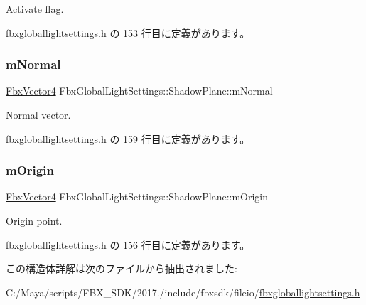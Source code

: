 Activate flag. 



 fbxgloballightsettings.\+h の 153 行目に定義があります。

\mbox{\label{struct_fbx_global_light_settings_1_1_shadow_plane_af68d57885d38ed6679a04bea2e663a33}} 
\subsubsection{\texorpdfstring{m\+Normal}{mNormal}}
{\footnotesize\ttfamily \hyperlink{class_fbx_vector4}{Fbx\+Vector4} Fbx\+Global\+Light\+Settings\+::\+Shadow\+Plane\+::m\+Normal}



Normal vector. 



 fbxgloballightsettings.\+h の 159 行目に定義があります。

\mbox{\label{struct_fbx_global_light_settings_1_1_shadow_plane_aab22ea42cde196c6aebce68258f76fd4}} 
\subsubsection{\texorpdfstring{m\+Origin}{mOrigin}}
{\footnotesize\ttfamily \hyperlink{class_fbx_vector4}{Fbx\+Vector4} Fbx\+Global\+Light\+Settings\+::\+Shadow\+Plane\+::m\+Origin}



Origin point. 



 fbxgloballightsettings.\+h の 156 行目に定義があります。



この構造体詳解は次のファイルから抽出されました\+:\begin{DoxyCompactItemize}
\item 
C\+:/\+Maya/scripts/\+F\+B\+X\+\_\+\+S\+D\+K/2017./include/fbxsdk/fileio/\hyperlink{fbxgloballightsettings_8h}{fbxgloballightsettings.\+h}\end{DoxyCompactItemize}
